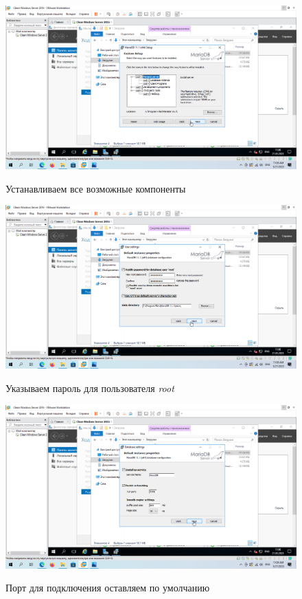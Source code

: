 \documentclass[a4paper]{article}
\begin{document}
  \begin{figure}[H]
    \centering
    \includegraphics[width=\textwidth]{11_0019}
    \label{img:19}
    \caption{Устанавливаем все возможные компоненты}
  \end{figure}

  \begin{figure}[H]
    \centering
    \includegraphics[width=\textwidth]{11_0020}
    \label{img:20}
    \caption{Указываем пароль для пользователя \textit{root}}
  \end{figure}

  \begin{figure}[H]
    \centering
    \includegraphics[width=\textwidth]{11_0021}
    \label{img:21}
    \caption{Порт для подключения оставляем по умолчанию}
  \end{figure}
\end{document}
